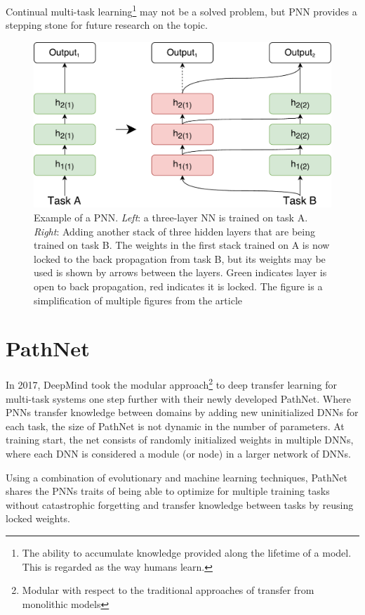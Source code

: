 \documentclass[a4paper,english]{report}
\begin{document}
Continual multi-task learning\footnote{The ability to accumulate knowledge provided along the lifetime of a model. This is regarded as the way humans learn.} may not be a solved problem, but PNN provides a stepping stone for future research on the topic. 
\begin{figure}[t]
    \includegraphics[width=\textwidth]{figures/ProgressiveNeuralNet.pdf}
    \caption{Example of a PNN. \textit{Left}: a three-layer NN is trained on task A. \textit{Right}: Adding another stack of three hidden layers that are being trained on task B. The weights in the first stack trained on A is now locked to the back propagation from task B, but its weights may be used is shown by arrows between the layers. Green indicates layer is open to back propagation, red indicates it is locked. The figure is a simplification of multiple figures from the article\cite{progressiveneuralnetworks}}
    \label{fig:pnn}
\end{figure}

\section{PathNet}\label{pathnet}
In 2017, DeepMind took the modular approach\footnote{Modular with respect to the traditional approaches of transfer from monolithic models} to deep transfer learning for multi-task systems one step further with their newly developed PathNet\cite{pathnet}. Where PNNs transfer knowledge between domains by adding new uninitialized DNNs for each task, the size of PathNet is not dynamic in the number of parameters. At training start, the net consists of randomly initialized weights in multiple DNNs, where each DNN is considered a module (or node) in a larger network of DNNs. 

Using a combination of evolutionary and machine learning techniques, PathNet shares the PNNs traits of being able to optimize for multiple training tasks without catastrophic forgetting and transfer knowledge between tasks by reusing locked weights.  
\end{document}
